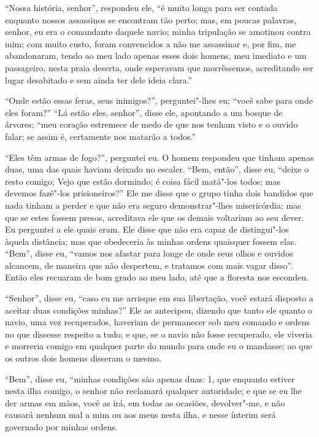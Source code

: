 ``Nossa história, senhor'', respondeu ele, ``é muito longa para ser
contada enquanto nossos assassinos se encontram tão perto; mas, em
poucas palavras, senhor, eu era o comandante daquele navio; minha
tripulação se amotinou contra mim; com muito custo, foram convencidos a
não me assassinar e, por fim, me abandonaram, tendo ao meu lado apenas
esses dois homens, meu imediato e um passageiro, nesta praia deserta,
onde esperavam que morrêssemos, acreditando ser lugar desabitado e sem
ainda ter dele ideia clara.''

``Onde estão essas feras, seus inimigos?'', perguntei"-lhes eu; ``você
sabe para onde eles foram?'' ``Lá estão eles, senhor'', disse ele,
apontando a um bosque de árvores; ``meu coração estremece de medo de que
nos tenham visto e o ouvido falar; se assim é, certamente nos matarão a
todos.''

``Eles têm armas de fogo?'', perguntei eu. O homem respondeu que tinham
apenas duas, uma das quais haviam deixado no escaler. ``Bem, então'',
disse eu, ``deixe o resto comigo; Vejo que estão dormindo; é coisa fácil
matá"-los todos; mas devemos fazê"-los prisioneiros?'' Ele me disse que o
grupo tinha dois bandidos que nada tinham a perder e que não era seguro
demonstrar"-lhes misericórdia; mas que se estes fossem presos, acreditava
ele que os demais voltariam ao seu dever. Eu perguntei a ele quais eram.
Ele disse que não era capaz de distingui"-los àquela distância; mas que
obedeceria às minhas ordens quaisquer fossem elas. ``Bem'', disse eu,
``vamos nos afastar para longe de onde seus olhos e ouvidos alcancem, de
maneira que não despertem, e tratamos com mais vagar disso''. Então eles
recuaram de bom grado ao meu lado, até que a floresta nos escondeu.

``Senhor'', disse eu, ``caso eu me arrisque em sua libertação, você
estará disposto a aceitar duas condições minhas?'' Ele as antecipou,
dizendo que tanto ele quanto o navio, uma vez recuperados, haveriam de
permanecer sob meu comando e ordens no que dissesse respeito a tudo; e
que, se o navio não fosse recuperado, ele viveria e morreria comigo em
qualquer parte do mundo para onde eu o mandasse; ao que os outros dois
homens disseram o mesmo.

``Bem'', disse eu, ``minhas condições são apenas duas: 1, que enquanto
estiver nesta ilha comigo, o senhor não reclamará qualquer autoridade; e
que se eu lhe der armas em mãos, você as irá, em todas as ocasiões,
devolver"-me, e não causará nenhum mal a mim ou aos meus nesta ilha, e
nesse ínterim será governado por minhas ordens.

